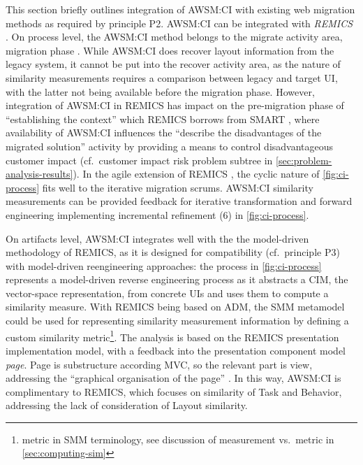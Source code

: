 This section briefly outlines integration of AWSM:CI with existing web migration methods as required by principle P2.
AWSM:CI can be integrated with \emph{REMICS} \autocite{Mohagheghi2011REMICS}.
On process level, the AWSM:CI method belongs to the migrate activity area, migration phase \autocite{REMICS2013Migrate}.
While AWSM:CI does recover layout information from the legacy system, it cannot be put into the recover activity area, as the nature of similarity measurements requires a comparison between legacy and target UI, with the latter not being available before the migration phase.
However, integration of AWSM:CI in REMICS has impact on the pre-migration phase of ``establishing the context'' \autocite{Mohagheghi2011REMICS} which REMICS borrows from SMART \autocite{Lewis2008SMART}, where availability of AWSM:CI influences the ``describe the disadvantages of the migrated solution'' activity by providing a means to control disadvantageous customer impact (cf.~customer impact risk problem subtree in \cref{sec:problem-analysis-results}).
In the agile extension of REMICS \autocite{Krasteva2013REMICSAgile}, the cyclic nature of \cref{fig:ci-process} fits well to the iterative migration scrums.
AWSM:CI similarity measurements can be provided feedback for iterative transformation and forward engineering implementing incremental refinement (6) in \cref{fig:ci-process}.

On artifacts level, AWSM:CI integrates well with the the model-driven methodology of REMICS, as it is designed for compatibility (cf.~principle P3) with model-driven reengineering approaches: the process in \cref{fig:ci-process} represents a model-driven reverse engineering process as it abstracts a CIM, the vector-space representation, from concrete UIs and uses them to compute a similarity measure.
With REMICS being based on ADM, the SMM metamodel \autocite{OMG2012SMM} could be used for representing similarity measurement information by defining a custom similarity metric\footnote{metric in SMM terminology, see discussion of measurement vs.~metric in \cref{sec:computing-sim}}.
The analysis is based on the REMICS presentation implementation model, with a feedback into the presentation component model \emph{page}.
Page is substructure according MVC, so the relevant part is view, addressing the ``graphical organisation of the page'' \autocite{REMICS2013Migrate}.
In this way, AWSM:CI is complimentary to REMICS, which focuses on similarity of Task and Behavior, addressing the lack of consideration of Layout similarity.

